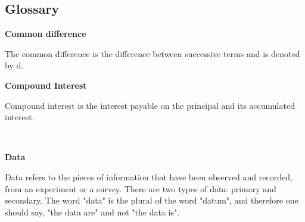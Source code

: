        \def\leftmark{GLOSSARY}
      \def\rightmark{GLOSSARY}
      \begin{indexheading}
\chapter{Glossary}
      \label{col11306*Glossary}
      \end{indexheading}
      \vspace{.3cm}
    \begin{description}\setlength{\topsep}{0cm}\setlength{\itemsep}{0cm}
    \setlength{\parskip}{0cm}\setlength{\parsep}{0cm}
    \setlength{\partopsep}{0cm}
    \setlength{\labelwidth}{.6cm}\setlength{\labelsep}{0cm}
    \setlength{\leftmargin}{1cm}
	    \vspace{.3cm}
	    \item[{\large \bfseries C}]\noindent\raggedright
	    {\bf Common difference}\\\begin{description}\item{\hspace{.3cm}}\hspace{.3cm}The common difference is the difference between successive terms and is denoted by d.\\\end{description}
	    \item[] \noindent\raggedright {\bf  Compound Interest }\\\begin{description}\item{\hspace{.3cm}}\hspace{.3cm}
      \label{m39334*id72635}Compound interest is the interest payable on the principal and its accumulated interest. \par 
      \\\end{description}
	    \vspace{.3cm}
	    \item[{\large \bfseries D}]\noindent\raggedright
	    {\bf  Data }\\\begin{description}\item{\hspace{.3cm}}\hspace{.3cm}
          \label{m39403*id200337}Data refers to the pieces of information that have been observed and recorded, from an experiment or a survey. There are two types of data: primary and secondary. The word "data" is the plural of the word "datum", and therefore one should say, "the data are" and not "the data is". \par 

\end{description}
\end{description}
